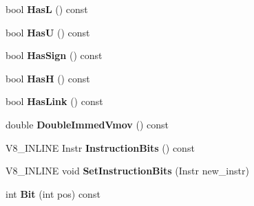 \begin{DoxyCompactItemize}
\item 
bool {\bfseries HasL} () const \hypertarget{classv8_1_1internal_1_1_instruction_abd8f02e914563e52170cd591d29d43d5}{}\label{classv8_1_1internal_1_1_instruction_abd8f02e914563e52170cd591d29d43d5}

\item 
bool {\bfseries HasU} () const \hypertarget{classv8_1_1internal_1_1_instruction_aeb04d35f031d8c48f02806abe7ca245d}{}\label{classv8_1_1internal_1_1_instruction_aeb04d35f031d8c48f02806abe7ca245d}

\item 
bool {\bfseries Has\+Sign} () const \hypertarget{classv8_1_1internal_1_1_instruction_ad65ad7e46ab7b96242deb1077342e6be}{}\label{classv8_1_1internal_1_1_instruction_ad65ad7e46ab7b96242deb1077342e6be}

\item 
bool {\bfseries HasH} () const \hypertarget{classv8_1_1internal_1_1_instruction_a81ab0a7f7cb799be7882307374638327}{}\label{classv8_1_1internal_1_1_instruction_a81ab0a7f7cb799be7882307374638327}

\item 
bool {\bfseries Has\+Link} () const \hypertarget{classv8_1_1internal_1_1_instruction_a024f7d463325b54e1a98aee0c61552e3}{}\label{classv8_1_1internal_1_1_instruction_a024f7d463325b54e1a98aee0c61552e3}

\item 
double {\bfseries Double\+Immed\+Vmov} () const \hypertarget{classv8_1_1internal_1_1_instruction_acab475da8a15a97ba18b8b131d2e9a7b}{}\label{classv8_1_1internal_1_1_instruction_acab475da8a15a97ba18b8b131d2e9a7b}

\item 
V8\+\_\+\+I\+N\+L\+I\+NE Instr {\bfseries Instruction\+Bits} () const \hypertarget{classv8_1_1internal_1_1_instruction_aa79e0c1e49aa80746c09798ccad2cd23}{}\label{classv8_1_1internal_1_1_instruction_aa79e0c1e49aa80746c09798ccad2cd23}

\item 
V8\+\_\+\+I\+N\+L\+I\+NE void {\bfseries Set\+Instruction\+Bits} (Instr new\+\_\+instr)\hypertarget{classv8_1_1internal_1_1_instruction_a5beb1e5b3af5ab0d6e44e27df166afe0}{}\label{classv8_1_1internal_1_1_instruction_a5beb1e5b3af5ab0d6e44e27df166afe0}

\item 
int {\bfseries Bit} (int pos) const \hypertarget{classv8_1_1internal_1_1_instruction_a6014a9c241b83362326540545449e673}{}\label{classv8_1_1internal_1_1_instruction_a6014a9c241b83362326540545449e673}


\end{DoxyCompactItemize}
